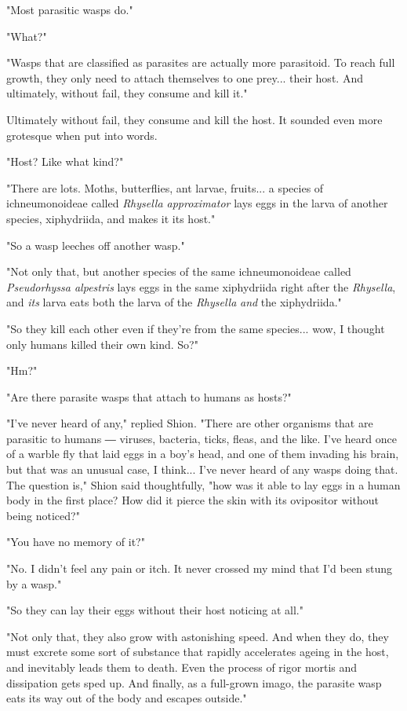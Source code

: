 "Most parasitic wasps do."

"What?"

"Wasps that are classified as parasites are actually more parasitoid. To
reach full growth, they only need to attach themselves to one prey...
their host. And ultimately, without fail, they consume and kill it."

Ultimately without fail, they consume and kill the host. It sounded even
more grotesque when put into words.

"Host? Like what kind?"

"There are lots. Moths, butterflies, ant larvae, fruits... a species of
ichneumonoideae called \emph{Rhysella approximator} lays eggs in the larva of
another species, xiphydriida, and makes it its host."

"So a wasp leeches off another wasp."

"Not only that, but another species of the same ichneumonoideae called
\emph{\emph{Pseudorhyssa alpestris}} lays eggs in the same xiphydriida right after the
\emph{Rhysella}, and \emph{its} larva eats both the larva of the \emph{Rhysella} \emph{and} the
xiphydriida."

"So they kill each other even if they're from the same species... wow, I
thought only humans killed their own kind. So?"

"Hm?"

"Are there parasite wasps that attach to humans as hosts?"

"I've never heard of any," replied Shion. "There are other organisms
that are parasitic to humans ― viruses, bacteria, ticks, fleas, and the
like. I've heard once of a warble fly that laid eggs in a boy's head,
and one of them invading his brain, but that was an unusual case, I
think... I've never heard of any wasps doing that. The question is,"
Shion said thoughtfully, "how was it able to lay eggs in a human body in
the first place? How did it pierce the skin with its ovipositor without
being noticed?"

"You have no memory of it?"

"No. I didn't feel any pain or itch. It never crossed my mind that I'd
been stung by a wasp."

"So they can lay their eggs without their host noticing at all."

"Not only that, they also grow with astonishing speed. And when they do,
they must excrete some sort of substance that rapidly accelerates ageing
in the host, and inevitably leads them to death. Even the process of
rigor mortis and dissipation gets sped up. And finally, as a full-grown
imago, the parasite wasp eats its way out of the body and escapes
outside."

